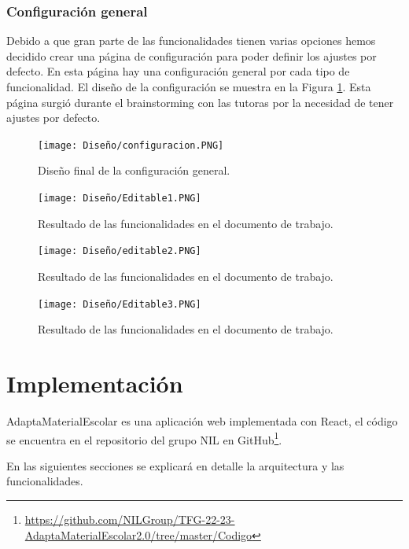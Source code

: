 \subsubsection{Configuración general}
Debido a que gran parte de las funcionalidades tienen varias opciones hemos decidido crear una página de configuración para poder definir los ajustes por defecto. En esta página hay una configuración general por cada tipo de funcionalidad. El diseño de la configuración se muestra en la Figura \ref{configu}. Esta página surgió durante el brainstorming con las tutoras por la necesidad de tener ajustes por defecto.

\begin{figure}[ht!]
  \centering
  \texttt{[image: Diseño/configuracion.PNG]}
  \caption{Diseño final de la configuración general.}
  \label{configu}
\end{figure}

\begin{figure}[ht!]
  \centering
  \texttt{[image: Diseño/Editable1.PNG]}
  \caption{Resultado de las funcionalidades en el documento de trabajo.}
  \label{editable1}
\end{figure}

\begin{figure}[ht!]
  \centering
  \texttt{[image: Diseño/editable2.PNG]}
  \caption{Resultado de las funcionalidades en el documento de trabajo.}
  \label{editable2}
\end{figure}

\begin{figure}[ht!]
  \centering
  \texttt{[image: Diseño/Editable3.PNG]}
  \caption{Resultado de las funcionalidades en el documento de trabajo.}
  \label{editable3}
\end{figure}

\section{Implementación}
AdaptaMaterialEscolar es una aplicación web implementada con React, el código se encuentra en el repositorio del grupo NIL en GitHub\footnote{\url{https://github.com/NILGroup/TFG-22-23-AdaptaMaterialEscolar2.0/tree/master/Codigo}}.

En las siguientes secciones se explicará en detalle la arquitectura y las funcionalidades.
